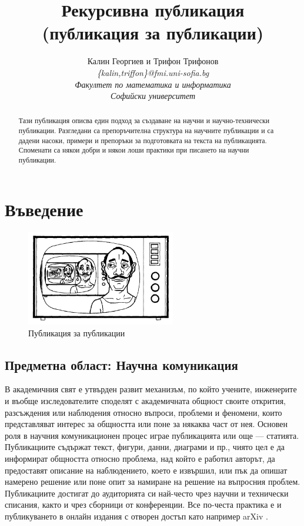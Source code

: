 \documentclass[11pt, oneside]{article}     %
\title{Рекурсивна публикация \\
(публикация за публикации)}
\author{Калин Георгиев и Трифон Трифонов\\ 
\textit{\{kalin,triffon\}@fmi.uni-sofia.bg}\\
\emph{Факултет по математика и информатика}\\\emph{Софийски университет}}
\begin{document}
\maketitle

\begin{abstract}
 Тази публикация описва един подход за създаване на научни и научно-технически публикации. Разгледани са препоръчителна структура на научните публикации и са дадени насоки, примери и препоръки за подготовката на текста на публикацията. Споменати са някои добри и някои лоши практики при писането на научни публикации.
\end{abstract}

\section{Въведение}
\begin{figure}[htbp]
  \centering
  \includegraphics[width=6.5cm]{images/wirth}
  \caption[Да погледнем към себе си \cite{wirth}]
   {Публикация за публикации \cite{wirth}}
  \label{fig:wirth}
\end{figure}


\subsection* {Предметна област: Научна комуникация}

В академичния свят е утвърден развит механизъм, по който учените, инженерите и въобще изследователите споделят с академичната общност своите открития, разсъждения или наблюдения относно въпроси, проблеми и феномени, които представляват интерес за общността или поне за някаква част от нея. Основен роля в научния комуникационен процес играе публикацията или още --- статията. Публикациите съдържат текст, фигури, данни, диаграми и пр., чиято цел е да информират общността относно проблема, над който е работил авторът, да предоставят описание на наблюдението, което е извършил, или пък да опишат намерено решение или поне опит за намиране на решение на въпросния проблем. Публикациите достигат до аудиторията си най-често чрез научни и технически списания, както и чрез сборници от конференции. Все по-честа практика е и публикуването в онлайн издания с отворен достъп като например arXiv \cite{arxiv}.
\end{document}
